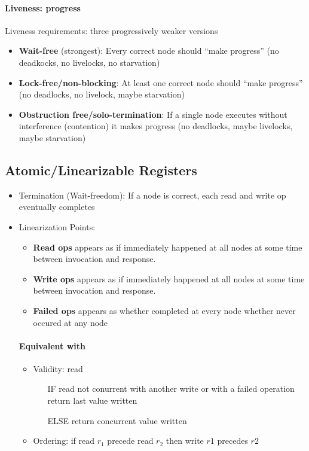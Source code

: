 \paragraph{Liveness: progress\newline}

Liveness requirements: three progressively weaker versions
\begin{itemize}
	\item \textbf{Wait-free} (strongest): Every correct node should \enquote{make progress}
	(no deadkocks, no livelocks, no starvation)
	\item \textbf{Lock-free/non-blocking}: At least one correct node should
	\enquote{make progress} (no deadlocks, no livelock, maybe starvation)
	\item \textbf{Obstruction free/solo-termination}: If a single node executes
	without interference (contention) it makes progress
	(no deadlocks, maybe livelocks, maybe starvation)
\end{itemize}

\subsection{Atomic/Linearizable Registers}

\begin{itemize}
	\item Termination (Wait-freedom): If a node is correct, each read and write op
	eventually completes
	\item Linearization Points:
	\begin{itemize}
		\item \textbf{Read ops} appears as if immediately happened at all nodes
		at some time between invocation and response.
		\item \textbf{Write ops} appears as if immediately happened at all nodes
		at some time between invocation and response.
		\item \textbf{Failed ops} appears as whether completed at every node
		whether never occured at any node
	\end{itemize}

    \paragraph{Equivalent with}
    \begin{itemize}
        \item Validity: read
            \begin{enumerate}
                \item[IF] read not conurrent with another write or with a failed operation
                    return last value written
                \item[ELSE] return concurrent value written
            \end{enumerate}
        \item Ordering: if read $r_1$ precede read $r_2$ then write $r1$ precedes $r2$
    \end{itemize}
\end{itemize}


